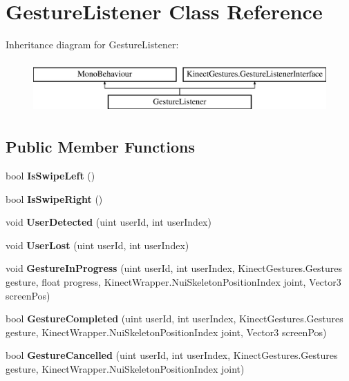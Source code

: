 \hypertarget{class_gesture_listener}{}\section{Gesture\+Listener Class Reference}
\label{class_gesture_listener}
Inheritance diagram for Gesture\+Listener\+:\begin{figure}[H]
\begin{center}
\leavevmode
\includegraphics[height=2.000000cm]{class_gesture_listener}
\end{center}
\end{figure}
\subsection*{Public Member Functions}
\begin{DoxyCompactItemize}
\item 
\mbox{\label{class_gesture_listener_ab6f6cda6d3d33adbbc95a958adbcd4ba}} 
bool {\bfseries Is\+Swipe\+Left} ()
\item 
\mbox{\label{class_gesture_listener_a60dca02bf253396f24afe92d4c8d3b0e}} 
bool {\bfseries Is\+Swipe\+Right} ()
\item 
\mbox{\label{class_gesture_listener_a193b273dd51d42ff2dfb9bacb9971e2c}} 
void {\bfseries User\+Detected} (uint user\+Id, int user\+Index)
\item 
\mbox{\label{class_gesture_listener_aee0bc269374b5641ac71d6a0720b5309}} 
void {\bfseries User\+Lost} (uint user\+Id, int user\+Index)
\item 
\mbox{\label{class_gesture_listener_a133180515cc44003a7668f7ad4b79984}} 
void {\bfseries Gesture\+In\+Progress} (uint user\+Id, int user\+Index, Kinect\+Gestures.\+Gestures gesture, float progress, Kinect\+Wrapper.\+Nui\+Skeleton\+Position\+Index joint, Vector3 screen\+Pos)
\item 
\mbox{\label{class_gesture_listener_ac2de008d4400c5da2bc7810430bdd50c}} 
bool {\bfseries Gesture\+Completed} (uint user\+Id, int user\+Index, Kinect\+Gestures.\+Gestures gesture, Kinect\+Wrapper.\+Nui\+Skeleton\+Position\+Index joint, Vector3 screen\+Pos)
\item 
\mbox{\label{class_gesture_listener_a4c3782eff4d837d287988828b8e4970f}} 
bool {\bfseries Gesture\+Cancelled} (uint user\+Id, int user\+Index, Kinect\+Gestures.\+Gestures gesture, Kinect\+Wrapper.\+Nui\+Skeleton\+Position\+Index joint)
\end{DoxyCompactItemize}
